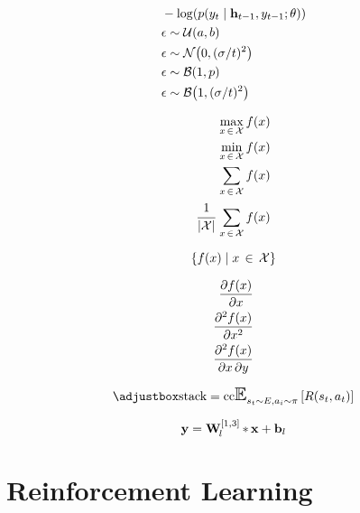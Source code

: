 \documentclass[a4paper,11pt]{article}
\begin{document}
\begin{align*}
	& -\apply{\log}{\pc{y_{t}}{\ve{h}_{t-1},y_{t-1};\theta}} \\
	& \epsilon \obey \uniform{a}{b} \\
	& \epsilon \obey \gaussian{0}{(\sigma/t)^{2}} \\
	& \epsilon \obey \bernoulli{p} \\
	& \epsilon \obey \binomial{1}{(\sigma/t)^{2}} \\
\end{align*}

\begin{align*}
	\maxset{f}{x}{\mathcal{X}} \\
	\minset{f}{x}{\mathcal{X}} \\
	\sumset{f}{x}{\mathcal{X}} \\
	\avgset{f}{x}{\mathcal{X}} \\
\end{align*}

\begin{equation*}
	\mapset{f}{x}{\mathcal{X}}
\end{equation*}

\begin{align*}
	\pd{\apply{f}{x}}{x} \\
	\pdn{\apply{f}{x}}{x}{2} \\
	\pds{\apply{f}{x}}{x}{y} \\
\end{align*}

\begin{equation}
	\applyb{\expect_{s_{t}\obey E,a_i\obey \pi}}{\apply{R}{s_{t},a_{t}}}
\end{equation}


\begin{equation}
	\ve{y}=\conv{1,3}{\ve{x}}{l}
\end{equation}


\section{Reinforcement Learning} %
\label{sec:reinforcement_learning}

\newcommand{\grad}[3]{\nabla_{#3}\,\apply{#1}{#2}}
\newcommand{\gradn}[4]{\nabla_{#3}^{#4}\,\apply{#1}{#2}}
\end{document}
